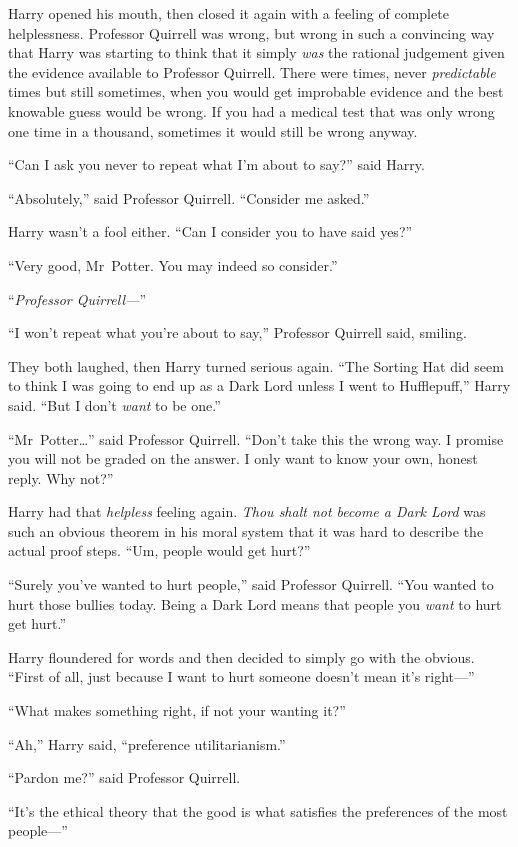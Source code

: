 Harry opened his mouth, then closed it again with a feeling of complete helplessness. Professor Quirrell was wrong, but wrong in such a convincing way that Harry was starting to think that it simply \emph{was} the rational judgement given the evidence available to Professor Quirrell. There were times, never \emph{predictable} times but still sometimes, when you would get improbable evidence and the best knowable guess would be wrong. If you had a medical test that was only wrong one time in a thousand, sometimes it would still be wrong anyway.

“Can I ask you never to repeat what I’m about to say?” said Harry.

“Absolutely,” said Professor Quirrell. “Consider me asked.”

Harry wasn’t a fool either. “Can I consider you to have said yes?”

“Very good, Mr~Potter. You may indeed so consider.”

“\emph{Professor Quirrell—}”

“I won’t repeat what you’re about to say,” Professor Quirrell said, smiling.

They both laughed, then Harry turned serious again. “The Sorting Hat did seem to think I was going to end up as a Dark Lord unless I went to Hufflepuff,” Harry said. “But I don’t \emph{want} to be one.”

“Mr~Potter…” said Professor Quirrell. “Don’t take this the wrong way. I promise you will not be graded on the answer. I only want to know your own, honest reply. Why not?”

Harry had that \emph{helpless} feeling again. \emph{Thou shalt not become a Dark Lord} was such an obvious theorem in his moral system that it was hard to describe the actual proof steps. “Um, people would get hurt?”

“Surely you’ve wanted to hurt people,” said Professor Quirrell. “You wanted to hurt those bullies today. Being a Dark Lord means that people you \emph{want} to hurt get hurt.”

Harry floundered for words and then decided to simply go with the obvious. “First of all, just because I want to hurt someone doesn’t mean it’s right—”

“What makes something right, if not your wanting it?”

“Ah,” Harry said, “preference utilitarianism.”

“Pardon me?” said Professor Quirrell.

“It’s the ethical theory that the good is what satisfies the preferences of the most people—”


